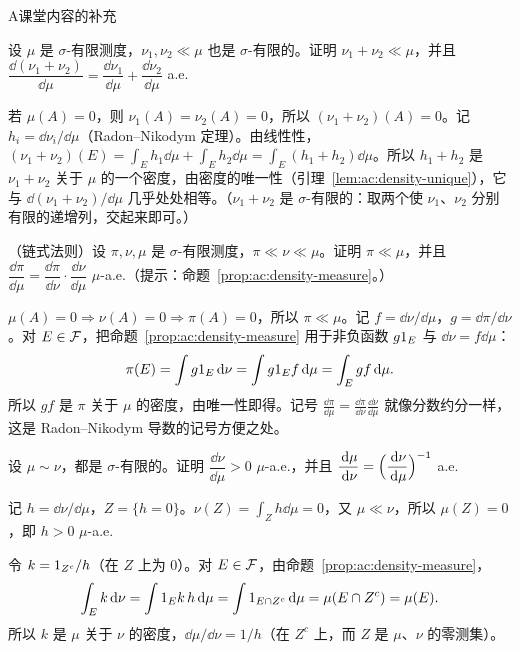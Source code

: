 \begin{exercises}{A}{课堂内容的补充}
\item\label{ex:ac:A1} 设 $\mu$ 是 $\sigma$-有限测度，$\nu_1,\nu_2\ll\mu$ 也是 $\sigma$-有限的。证明 $\nu_1+\nu_2\ll\mu$，并且 $\dfrac{\dd(\nu_1+\nu_2)}{\dd\mu}=\dfrac{\dd\nu_1}{\dd\mu}+\dfrac{\dd\nu_2}{\dd\mu}$ a.e.
\begin{solution}
若 $\mu(A)=0$，则 $\nu_1(A)=\nu_2(A)=0$，所以 $(\nu_1+\nu_2)(A)=0$。记 $h_i=\dd\nu_i/\dd\mu$（Radon--Nikodym 定理）。由线性性，$(\nu_1+\nu_2)(E)=\int_Eh_1\dd\mu+\int_Eh_2\dd\mu=\int_E(h_1+h_2)\dd\mu$。所以 $h_1+h_2$ 是 $\nu_1+\nu_2$ 关于 $\mu$ 的一个密度，由密度的唯一性（引理~\ref{lem:ac:density-unique}），它与 $\dd(\nu_1+\nu_2)/\dd\mu$ 几乎处处相等。（$\nu_1+\nu_2$ 是 $\sigma$-有限的：取两个使 $\nu_1$、$\nu_2$ 分别有限的递增列，交起来即可。）
\end{solution}

\item\label{ex:ac:A2} （链式法则）设 $\pi,\nu,\mu$ 是 $\sigma$-有限测度，$\pi\ll\nu\ll\mu$。证明 $\pi\ll\mu$，并且 $\dfrac{\dd\pi}{\dd\mu}=\dfrac{\dd\pi}{\dd\nu}\cdot\dfrac{\dd\nu}{\dd\mu}$ $\mu$-a.e.（提示：命题~\ref{prop:ac:density-measure}。）
\begin{solution}
$\mu(A)=0\Rightarrow\nu(A)=0\Rightarrow\pi(A)=0$，所以 $\pi\ll\mu$。记 $f=\dd\nu/\dd\mu$，$g=\dd\pi/\dd\nu$。对 $E\in\mathcal{F}$，把命题~\ref{prop:ac:density-measure} 用于非负函数 $g1_E$ 与 $\dd\nu=f\dd\mu$：
\[
\pi(E)=\int g1_E\,\mathrm{d}\nu=\int g1_Ef\,\mathrm{d}\mu=\int_Egf\,\mathrm{d}\mu .
\]
所以 $gf$ 是 $\pi$ 关于 $\mu$ 的密度，由唯一性即得。记号 $\frac{\dd\pi}{\dd\mu}=\frac{\dd\pi}{\dd\nu}\frac{\dd\nu}{\dd\mu}$ 就像分数约分一样，这是 Radon--Nikodym 导数的记号方便之处。
\end{solution}

\item\label{ex:ac:A3} 设 $\mu\sim\nu$，都是 $\sigma$-有限的。证明 $\dfrac{\dd\nu}{\dd\mu}>0$ $\mu$-a.e.，并且 $\dfrac{\,\mathrm{d}\mu}{\,\mathrm{d}\nu}=\Bigl(\dfrac{\,\mathrm{d}\nu}{\,\mathrm{d}\mu}\Bigr)^{-1}$ a.e.
\begin{solution}
记 $h=\dd\nu/\dd\mu$，$Z=\{h=0\}$。$\nu(Z)=\int_Zh\dd\mu=0$，又 $\mu\ll\nu$，所以 $\mu(Z)=0$，即 $h>0$ $\mu$-a.e.

令 $k=1_{Z^c}/h$（在 $Z$ 上为 $0$）。对 $E\in\mathcal{F}$，由命题~\ref{prop:ac:density-measure}，
\[
\int_Ek\,\mathrm{d}\nu=\int1_Ek\,h\,\mathrm{d}\mu=\int1_{E\cap Z^c}\,\mathrm{d}\mu=\mu(E\cap Z^c)=\mu(E).
\]
所以 $k$ 是 $\mu$ 关于 $\nu$ 的密度，$\dd\mu/\dd\nu=1/h$（在 $Z^c$ 上，而 $Z$ 是 $\mu$、$\nu$ 的零测集）。
\end{solution}


\end{exercises}
